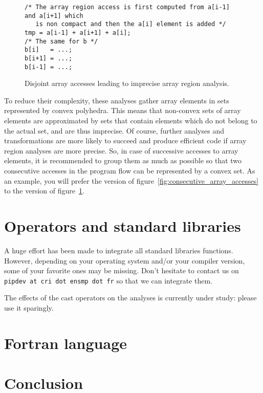 \documentclass[a4paper]{article}
\begin{document}
\begin{figure}
  \centering
  \begin{lstlisting}
/* The array region access is first computed from a[i-1] and a[i+1] which
   is non compact and then the a[i] element is added */
tmp = a[i-1] + a[i+1] + a[i];
/* The same for b */
b[i]   = ...;
b[i+1] = ...;
b[i-1] = ...;
  \end{lstlisting}
  \caption{Disjoint array accesses leading to imprecise array region
    analysis.}
  \label{fig:disjoint_array_accesses}
\end{figure}

To reduce their complexity, these analyses gather array elements in
sets represented by convex polyhedra. This means that non-convex sets
of array elements are approximated by sets that contain elements which
do not belong to the actual set, and are thus imprecise. Of course,
further analyses and transformations are more likely to succeed and
produce efficient code if array region analyses are more precise. So,
in case of successive accesses to array elements, it is recommended to
group them as much as possible so that two consecutive accesses in the
program flow can be represented by a convex set. As an example, you
will prefer the version of figure~\ref{fig:consecutive_array_accesses}
to the version of figure~\ref{fig:disjoint_array_accesses}.


\section{Operators and standard libraries}
\label{sec:operators_and_standard_libraries}

A huge effort has been made to integrate all standard libraries
functions. However, depending on your operating system and/or your
compiler version, some of your favorite ones may be missing. Don't
hesitate to contact us on \texttt{pipdev at cri dot ensmp dot fr} so
that we can integrate them.

The effects of the cast operators on the analyses is currently under
study: please use it sparingly.

\section{Fortran language}
\label{sec:fortran-language}

\section{Conclusion}
\label{sec:conclusion}
\end{document}
